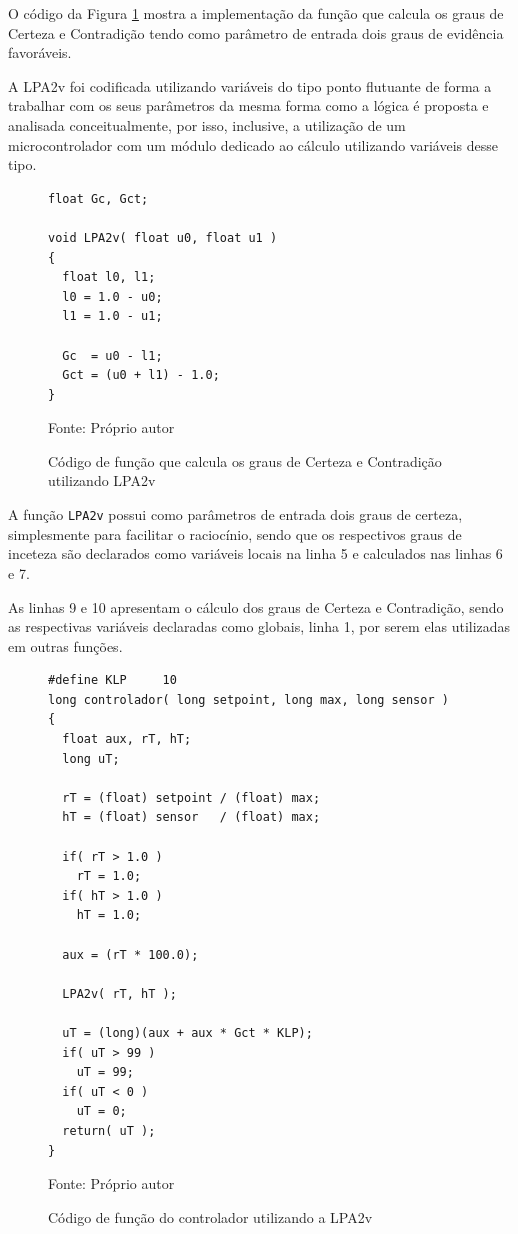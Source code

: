 O código da Figura \ref{fig:codigoGcGct} mostra 
a implementação da função que calcula os graus de Certeza e Contradição 
tendo como parâmetro de entrada dois graus de evidência favoráveis.

A LPA2v foi codificada utilizando variáveis do tipo ponto flutuante 
de forma a trabalhar com os seus parâmetros da mesma forma como a lógica é 
proposta e analisada conceitualmente, por isso, inclusive, 
a utilização de um microcontrolador com um módulo dedicado 
ao cálculo utilizando variáveis desse tipo. 


\begin{figure}[!htb]
\centering
\caption{Código de função que calcula os graus de Certeza e Contradição utilizando LPA2v}
\begin{minipage}{0.9\linewidth}
\begin{lstlisting}
float Gc, Gct;

void LPA2v( float u0, float u1 )
{
  float l0, l1;
  l0 = 1.0 - u0;
  l1 = 1.0 - u1;

  Gc  = u0 - l1;
  Gct = (u0 + l1) - 1.0;
}
\end{lstlisting}
\end{minipage}
\label{fig:codigoGcGct}

{\small Fonte: Próprio autor}
\end{figure}

A função \texttt{LPA2v} possui como parâmetros de entrada 
dois graus de certeza, simplesmente para facilitar o raciocínio,
sendo que os respectivos graus de inceteza 
são declarados como variáveis locais na linha 5 e calculados nas linhas 6 e 7.

As linhas 9 e 10 apresentam o cálculo dos graus de Certeza e Contradição, 
sendo as respectivas variáveis declaradas como globais, linha 1, 
por serem elas utilizadas em outras funções.







\begin{figure}[!h]%
\centering
\caption{Código de função do controlador utilizando a LPA2v}
\begin{minipage}{0.9\linewidth}
\lstset{firstnumber=12}
\begin{lstlisting}
#define KLP 	10
long controlador( long setpoint, long max, long sensor )
{
  float aux, rT, hT;
  long uT;

  rT = (float) setpoint / (float) max;
  hT = (float) sensor   / (float) max;

  if( rT > 1.0 )
    rT = 1.0;
  if( hT > 1.0 )
    hT = 1.0;
  
  aux = (rT * 100.0);

  LPA2v( rT, hT );
  
  uT = (long)(aux + aux * Gct * KLP);
  if( uT > 99 )
    uT = 99;
  if( uT < 0 ) 
    uT = 0;
  return( uT );
}

\end{lstlisting}
\end{minipage}
\label{fig:codigoControladorLPA2v}

{\small Fonte: Próprio autor}
\end{figure}


